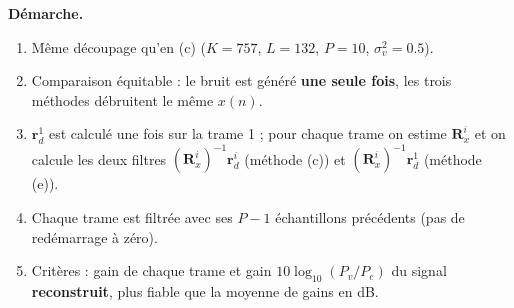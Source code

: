 \textbf{Démarche.}
\begin{enumerate}
  \item Même découpage qu'en (c) ($K=757$, $L=132$, $P=10$, $\sigma_v^2=0.5$).
  \item Comparaison équitable : le bruit est généré \textbf{une seule fois}, les trois méthodes débruitent le même $x(n)$.
  \item $\mathbf{r}^1_{d}$ est calculé une fois sur la trame 1 ; pour chaque trame on estime $\mathbf{R}^i_x$ et on calcule les deux filtres $(\mathbf{R}^i_x)^{-1}\mathbf{r}^i_{d}$ (méthode (c)) et $(\mathbf{R}^i_x)^{-1}\mathbf{r}^1_{d}$ (méthode (e)).
  \item Chaque trame est filtrée avec ses $P-1$ échantillons précédents (pas de redémarrage à zéro).
  \item Critères : gain de chaque trame et gain $10\log_{10}(P_v/P_e)$ du signal \textbf{reconstruit}, plus fiable que la moyenne de gains en dB.
\end{enumerate}

